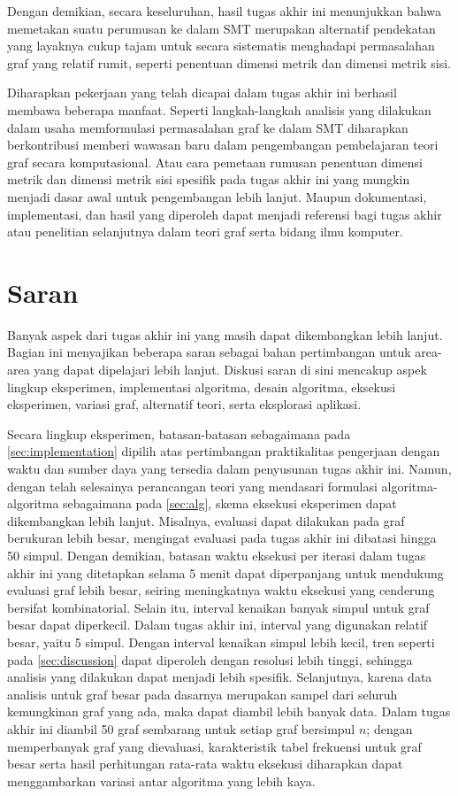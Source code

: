 Dengan demikian, secara keseluruhan, hasil tugas akhir ini menunjukkan bahwa memetakan suatu perumusan ke dalam SMT merupakan alternatif pendekatan yang layaknya cukup tajam untuk secara sistematis menghadapi permasalahan graf yang relatif rumit, seperti penentuan dimensi metrik dan dimensi metrik sisi.

Diharapkan pekerjaan yang telah dicapai dalam tugas akhir ini berhasil membawa beberapa manfaat. Seperti langkah-langkah analisis yang dilakukan dalam usaha memformulasi permasalahan graf ke dalam SMT diharapkan berkontribusi memberi wawasan baru dalam pengembangan pembelajaran teori graf secara komputasional. Atau cara pemetaan rumusan penentuan dimensi metrik dan dimensi metrik sisi spesifik pada tugas akhir ini yang mungkin menjadi dasar awal untuk pengembangan lebih lanjut. Maupun dokumentasi, implementasi, dan hasil yang diperoleh dapat menjadi referensi bagi tugas akhir atau penelitian selanjutnya dalam teori graf serta bidang ilmu komputer.

\section{Saran}

Banyak aspek dari tugas akhir ini yang masih dapat dikembangkan lebih lanjut. Bagian ini menyajikan beberapa saran sebagai bahan pertimbangan untuk area-area yang dapat dipelajari lebih lanjut. Diskusi saran di sini mencakup aspek lingkup eksperimen, implementasi algoritma, desain algoritma, eksekusi eksperimen, variasi graf, alternatif teori, serta eksplorasi aplikasi.

Secara lingkup eksperimen, batasan-batasan sebagaimana pada \autoref{sec:implementation} dipilih atas pertimbangan praktikalitas pengerjaan dengan waktu dan sumber daya yang tersedia dalam penyusunan tugas akhir ini. Namun, dengan telah selesainya perancangan teori yang mendasari formulasi algoritma-algoritma sebagaimana pada \autoref{sec:alg}, skema eksekusi eksperimen dapat dikembangkan lebih lanjut. Misalnya, evaluasi dapat dilakukan pada graf berukuran lebih besar, mengingat evaluasi pada tugas akhir ini dibatasi hingga 50 simpul. Dengan demikian, batasan waktu eksekusi per iterasi dalam tugas akhir ini yang ditetapkan selama 5 menit dapat diperpanjang untuk mendukung evaluasi graf lebih besar, seiring meningkatnya waktu eksekusi yang cenderung bersifat kombinatorial. Selain itu, interval kenaikan banyak simpul untuk graf besar dapat diperkecil. Dalam tugas akhir ini, interval yang digunakan relatif besar, yaitu 5 simpul. Dengan interval kenaikan simpul lebih kecil, tren seperti pada \autoref{sec:discussion} dapat diperoleh dengan resolusi lebih tinggi, sehingga analisis yang dilakukan dapat menjadi lebih spesifik. Selanjutnya, karena data analisis untuk graf besar pada dasarnya merupakan sampel dari seluruh kemungkinan graf yang ada, maka dapat diambil lebih banyak data. Dalam tugas akhir ini diambil 50 graf sembarang untuk setiap graf bersimpul \(n\); dengan memperbanyak graf yang dievaluasi, karakteristik tabel frekuensi untuk graf besar serta hasil perhitungan rata-rata waktu eksekusi diharapkan dapat menggambarkan variasi antar algoritma yang lebih kaya.

